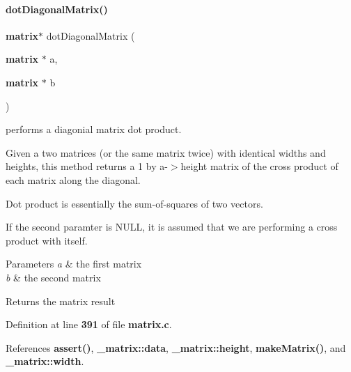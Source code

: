 \paragraph{dot\+Diagonal\+Matrix()}
{\footnotesize\ttfamily \textbf{ matrix}$\ast$ dot\+Diagonal\+Matrix (\begin{DoxyParamCaption}\item[{\textbf{ matrix} $\ast$}]{a,  }\item[{\textbf{ matrix} $\ast$}]{b }\end{DoxyParamCaption})}



performs a diagonial matrix dot product. 

Given a two matrices (or the same matrix twice) with identical widths and heights, this method returns a 1 by a-\/$>$height matrix of the cross product of each matrix along the diagonal.

Dot product is essentially the sum-\/of-\/squares of two vectors.

If the second paramter is N\+U\+LL, it is assumed that we are performing a cross product with itself. 
\begin{DoxyParams}{Parameters}
{\em a} & the first matrix \\
\hline
{\em b} & the second matrix \\
\hline
\end{DoxyParams}
\begin{DoxyReturn}{Returns}
the matrix result 
\end{DoxyReturn}


Definition at line \textbf{ 391} of file \textbf{ matrix.\+c}.



References \textbf{ assert()}, \textbf{ \+\_\+matrix\+::data}, \textbf{ \+\_\+matrix\+::height}, \textbf{ make\+Matrix()}, and \textbf{ \+\_\+matrix\+::width}.


